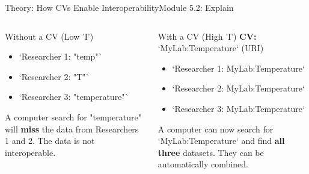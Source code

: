 \begin{frame}{Theory: How CVs Enable Interoperability}{Module 5.2: Explain}
    \begin{columns}
        \begin{block}{Without a CV (Low 'I')}
            \begin{itemize}
                \item `Researcher 1: "temp"`
                \item `Researcher 2: "T"`
                \item `Researcher 3: "temperature"`
            \end{itemize}
            \pause
            A computer search for "temperature" will \textbf{miss} the data from Researchers 1 and 2. The data is not interoperable.
        \end{block}
        
        \begin{block}{With a CV (High 'I')}
            \textbf{CV:} `MyLab:Temperature` (URI)
            \begin{itemize}
                \item `Researcher 1: MyLab:Temperature`
                \item `Researcher 2: MyLab:Temperature`
                \item `Researcher 3: MyLab:Temperature`
            \end{itemize}
            \pause
            A computer can now search for `MyLab:Temperature` and find \textbf{all three} datasets. They can be automatically combined.
        \end{block}
    \end{columns}
\end{frame}

